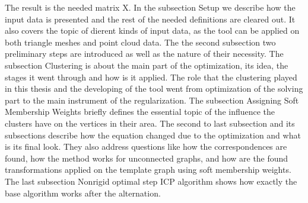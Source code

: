 \documentclass[../structure.tex]{subfiles}
\begin{document}
The result is the needed matrix X.
In the subsection Setup we describe how the input data is presented and
the rest of the needed definitions are cleared out. It also covers the topic
of dierent kinds of input data, as the tool can be applied on both triangle
meshes and point cloud data. The the second subsection two preliminary
steps are introduced as well as the nature of their necessity. The subsection
Clustering is about the main part of the optimization, its idea, the stages it
went through and how is it applied. The role that the clustering played in this
thesis and the developing of the tool went from optimization of the solving
part to the main instrument of the regularization. The subsection Assigning
Soft Membership Weights briefly defines the essential topic of the influence
the clusters have on the vertices in their area. The second to last subsection
and its subsections describe how the equation changed due to the optimization
and what is its final look. They also address questions like how the
correspondences are found, how the method works for unconnected graphs,
and how are the found transformations applied on the template graph using
soft membership weights. The last subsection Nonrigid optimal step ICP
algorithm shows how exactly the base algorithm works after the alternation.
\end{document}

